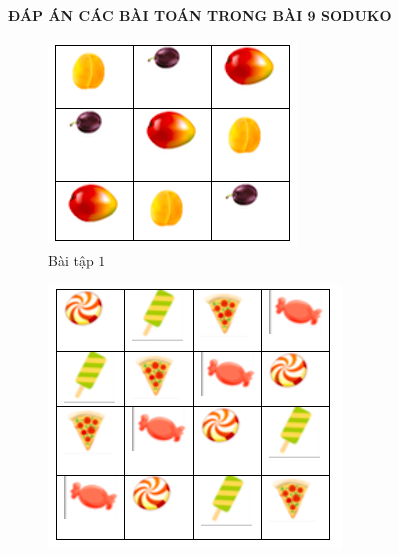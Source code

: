 \newpage
\begin{center}
	\textbf{\color{toancuabi}ĐÁP ÁN CÁC BÀI TOÁN TRONG BÀI $\pmb9$ SODUKO}
\end{center}
\begin{multicols}{2}
	\begin{figure}[H]
		\centering
		\vspace*{-5pt}
		\captionsetup{labelformat= empty, justification=centering}
		\includegraphics[width=0.9\linewidth]{sudoku1}
		\caption{\small{Bài tập $1$}}
		\vspace*{-10pt}
	\end{figure}
	\begin{figure}[H]
		\centering
		\vspace*{-5pt}
		\captionsetup{labelformat= empty, justification=centering}
		\includegraphics[width=0.9\linewidth]{sudoku2}

\end{figure}
\end{multicols}
